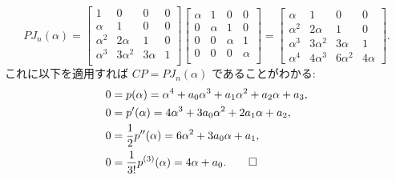 \documentclass[12pt,twoside]{jarticle}
\begin{document}
\begin{equation*}
  PJ_n(\alpha) = 
  \begin{bmatrix}
    1        & 0         & 0       & 0 \\
    \alpha   & 1         & 0       & 0 \\
    \alpha^2 & 2\alpha   & 1       & 0 \\
    \alpha^3 & 3\alpha^2 & 3\alpha & 1 \\
  \end{bmatrix}
  \begin{bmatrix}
    \alpha & 1      & 0      & 0 \\
    0      & \alpha & 1      & 0 \\
    0      & 0      & \alpha & 1 \\
    0      & 0      & 0      & \alpha \\
  \end{bmatrix}
  =
  \begin{bmatrix}
    \alpha   & 1         & 0         & 0 \\
    \alpha^2 & 2\alpha   & 1         & 0 \\
    \alpha^3 & 3\alpha^2 & 3\alpha   & 1 \\
    \alpha^4 & 4\alpha^3 & 6\alpha^2 & 4\alpha
  \end{bmatrix}.
\end{equation*}
これに以下を適用すれば $CP=PJ_n(\alpha)$ であることがわかる:
\begin{align*}
  &
  0 = p(\alpha) = \alpha^4 + a_0\alpha^3 + a_1\alpha^2 + a_2\alpha + a_3,
  \\ &
  0 = p'(\alpha) = 4\alpha^3 + 3a_0\alpha^2 + 2a_1\alpha + a_2,
  \\ &
  0 = \frac{1}{2}p''(\alpha) = 6\alpha^2 + 3a_0\alpha + a_1,
  \\ &
  0 = \frac{1}{3!}p^{(3)}(\alpha) = 4\alpha + a_0.
  \qed
\end{align*}
\end{document}
